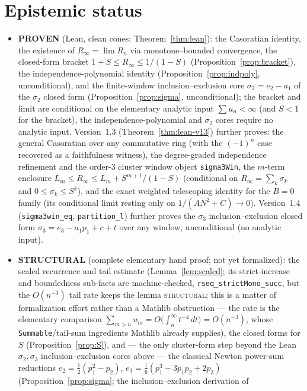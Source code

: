\documentclass[11pt]{article}
\newcommand{\Rinf}{R_\infty}
\begin{document}
\section{Epistemic status}\label{sec:status}

\begin{itemize}
\item \textbf{PROVEN} (Lean, clean cones; Theorem~\ref{thm:lean}): the Casoratian
identity, the existence of $\Rinf=\lim R_n$ via monotone--bounded convergence, the
closed-form bracket $1+S\le\Rinf\le1/(1-S)$ (Proposition~\ref{prop:bracket}), the
independence-polynomial identity (Proposition~\ref{prop:indpoly}, unconditional),
and the finite-window inclusion--exclusion core $\sigma_2=e_2-a_1$ of the $\sigma_2$
closed form (Proposition~\ref{prop:sigma}, unconditional); the bracket and limit are
conditional on the elementary analytic input $\sum u_n<\infty$ (and $S<1$ for the
bracket), the independence-polynomial and $\sigma_2$ cores require no analytic input.
Version~1.3 (Theorem~\ref{thm:lean-v13}) further proves: the general Casoratian over
any commutative ring (with the $(-1)^n$ case recovered as a faithfulness witness),
the degree-graded independence refinement and the order-$3$ cluster window object
\texttt{sigma3Win}, the $m$-term enclosure $L_m\le\Rinf\le L_m+S^{m+1}/(1-S)$
(conditional on $\Rinf=\sum_k\sigma_k$ and $0\le\sigma_k\le S^k$), and the exact
weighted telescoping identity for the $B=0$ family (its conditional limit resting
only on $1/(AN^2+C)\to0$). Version~1.4 (\texttt{sigma3win\_eq}, \texttt{partition\_l})
further proves the $\sigma_3$ inclusion--exclusion closed form
$\sigma_3=e_3-a_1p_1+c+t$ over any window, unconditional (no analytic input).
\item \textbf{STRUCTURAL} (complete elementary hand proof; not yet formalized): the
scaled recurrence and tail estimate (Lemma~\ref{lem:scaled}; its strict-increase and
boundedness sub-facts are machine-checked, \texttt{rseq\_strictMono\_succ}, but the
$O(n^{-3})$ tail rate keeps the lemma \textsc{structural}; this is a matter of
formalization effort rather than a Mathlib obstruction --- the rate is the elementary
comparison $\sum_{m>n}u_m=O\!\big(\int_n^\infty t^{-4}\,dt\big)=O(n^{-3})$, whose
\texttt{Summable}/tail-sum ingredients Mathlib already supplies), the closed forms for
$S$ (Proposition~\ref{prop:S}), and --- the only cluster-form step beyond the Lean
$\sigma_2,\sigma_3$ inclusion--exclusion cores above --- the classical Newton power-sum
reductions $e_2=\tfrac12(p_1^2-p_2)$, $e_3=\tfrac16(p_1^3-3p_1p_2+2p_3)$
(Proposition~\ref{prop:sigma}; the inclusion--exclusion derivation of

\end{itemize}
\end{document}
